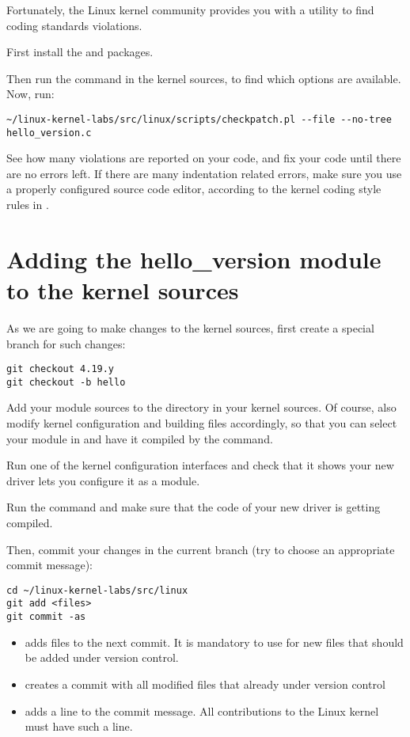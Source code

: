Fortunately, the Linux kernel community provides you with a utility to
find coding standards violations.

First install the  and  packages.

Then run the  command in the kernel sources,
to find which options are available.  Now, run:

\begin{verbatim}
~/linux-kernel-labs/src/linux/scripts/checkpatch.pl --file --no-tree hello_version.c
\end{verbatim}

See how many violations are reported on your code, and fix your code
until there are no errors left. If there are many indentation related
errors, make sure you use a properly configured source code editor,
according to the kernel coding style rules in
.

\section{Adding the hello\_version module to the kernel sources}

As we are going to make changes to the kernel sources, first create a
special branch for such changes:

\begin{verbatim}
git checkout 4.19.y
git checkout -b hello
\end{verbatim}

Add your module sources to the  directory in your
kernel sources. Of course, also modify kernel configuration and
building files accordingly, so that you can select your module in
 and have it compiled by the  command.

Run one of the kernel configuration interfaces and check that it
shows your new driver lets you configure it as a module.

Run the  command and make sure that the code of your new
driver is getting compiled.

Then, commit your changes in the current branch (try to choose an
appropriate commit message):

\begin{verbatim}
cd ~/linux-kernel-labs/src/linux
git add <files>
git commit -as
\end{verbatim}

\begin{itemize}
\item {} adds files to the next commit. It is mandatory to
  use for new files that should be added under version control.
\item {} creates a commit with all modified files
  that already under version control
\item {} adds a  line to the
      commit message. All contributions to the Linux kernel must have
      such a line.
\end{itemize}

